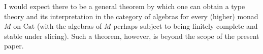 \documentclass[a4paper]{article}
\theoremstyle{remark}
\theoremstyle{definition}
\begin{document}
I would expect there to be a general theorem by which one can obtain a type theory and its interpretation in the category of algebras for every (higher) monad $M$ on $\mathrm{Cat}$ (with the algebras of $M$ perhaps subject to being finitely complete and stable under slicing).
Such a theorem, however, is beyond the scope of the present paper.



\end{document}
